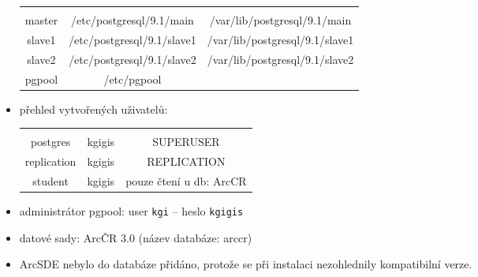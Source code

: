 \documentclass{thesisKGI}
\begin{document}
\begin{itemize}
\begin{table}[H]
            \begin{center}
            \begin{tabular}{|c|c|c|}
              \hline
              \color{purpurova7}{server} & \color{purpurova7}{config\_directory} & \color{purpurova7}{data\_directory} \\
                                 master& /etc/postgresql/9.1/main   & /var/lib/postgresql/9.1/main  \\
                                 slave1& /etc/postgresql/9.1/slave1 & /var/lib/postgresql/9.1/slave1  \\
                                 slave2& /etc/postgresql/9.1/slave2 & /var/lib/postgresql/9.1/slave2  \\
                                 pgpool& /etc/pgpool & \\
              \hline
              \end{tabular}
            \end{center}
        \end{table}
\item přehled vytvořených uživatelů:
        \begin{table}[H]
            \label{tServery}
            \begin{center}
            \begin{tabular}{|c|c|c|}
              \hline
              \color{purpurova7}{user} & \color{purpurova7}{heslo} & \color{purpurova7}{práva} \\
                                 postgres & kgigis & SUPERUSER  \\
                                 replication & kgigis & REPLICATION \\
                                 student & kgigis & pouze čtení u db: ArcCR  \\
              \hline
              \end{tabular}
            \end{center}
        \end{table}
      \item administrátor pgpool: user \texttt{kgi} – heslo \texttt{kgigis}
\item datové sady: ArcČR 3.0 (název databáze: arccr)
\item ArcSDE nebylo do databáze přidáno, protože se při instalaci nezohlednily kompatibilní verze. 
  \end{itemize}

  
\end{document}
